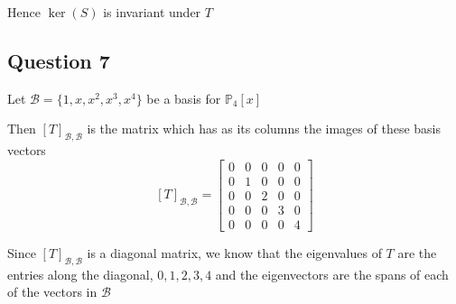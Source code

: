 \documentclass{article}
\begin{document}
Hence \(\ker(S)\) is invariant under \(T\)


\subsection*{Question 7}
Let \(\mathcal{B} = \{1, x, x^2, x^3, x^4\}\) be a basis for \(\mathbb{P}_4[x]\)

Then \([T]_{\mathcal{B}, \mathcal{B}}\) is the matrix which has as its columns the images of these basis vectors
\[
[T]_{\mathcal{B},\mathcal{B}} = \begin{bmatrix}
    0 & 0 & 0 & 0 & 0 \\
    0 & 1 & 0 & 0 & 0 \\
    0 & 0 & 2 & 0 & 0 \\
    0 & 0 & 0 & 3 & 0 \\
    0 & 0 & 0 & 0 & 4
\end{bmatrix}
\]

Since \([T]_{\mathcal{B},\mathcal{B}}\) is a diagonal matrix, we know that
the eigenvalues of \(T\) are the entries along the diagonal, \(0,1,2,3,4\)
and the eigenvectors are the spans of each of the vectors in \(\mathcal{B}\)
\end{document}
